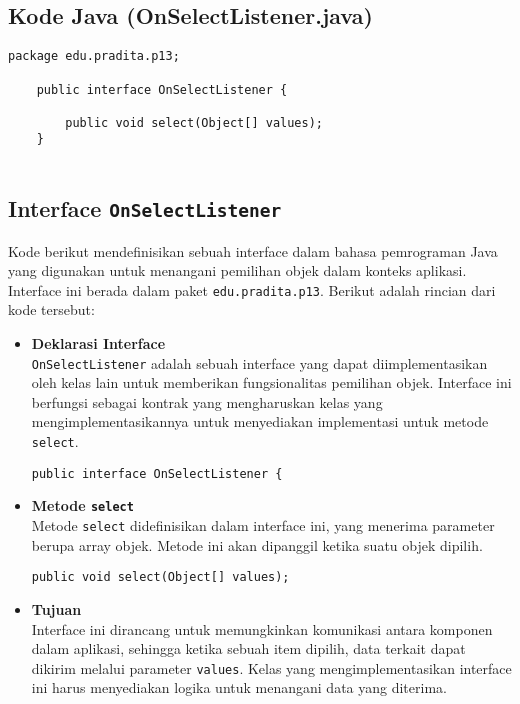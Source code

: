 \subsection{Kode Java (OnSelectListener.java)}

\begin{lstlisting}[style=JavaStyle]
	package edu.pradita.p13;
	
	public interface OnSelectListener {
		
		public void select(Object[] values);
	}
	
\end{lstlisting}

\subsection{Interface \texttt{OnSelectListener}}

Kode berikut mendefinisikan sebuah interface dalam bahasa pemrograman Java yang digunakan untuk menangani pemilihan objek dalam konteks aplikasi. Interface ini berada dalam paket \texttt{edu.pradita.p13}. Berikut adalah rincian dari kode tersebut:

\begin{itemize}
	\item \textbf{Deklarasi Interface} \\
	\texttt{OnSelectListener} adalah sebuah interface yang dapat diimplementasikan oleh kelas lain untuk memberikan fungsionalitas pemilihan objek. Interface ini berfungsi sebagai kontrak yang mengharuskan kelas yang mengimplementasikannya untuk menyediakan implementasi untuk metode \texttt{select}.
		\begin{lstlisting}[style=JavaStyle]
			public interface OnSelectListener {
		\end{lstlisting}
		
		\item \textbf{Metode \texttt{select}} \\
		Metode \texttt{select} didefinisikan dalam interface ini, yang menerima parameter berupa array objek. Metode ini akan dipanggil ketika suatu objek dipilih.
		\begin{lstlisting}[style=JavaStyle]
			public void select(Object[] values);
		\end{lstlisting}
		
		\item \textbf{Tujuan} \\
		Interface ini dirancang untuk memungkinkan komunikasi antara komponen dalam aplikasi, sehingga ketika sebuah item dipilih, data terkait dapat dikirim melalui parameter \texttt{values}. Kelas yang mengimplementasikan interface ini harus menyediakan logika untuk menangani data yang diterima.
	\end{itemize}


